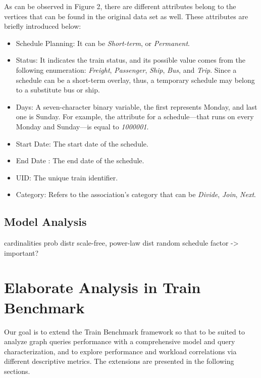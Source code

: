 As can be observed in Figure 2, %
there are different attributes belong to the vertices that can be found in the original data set as well. These attributes are briefly introduced below:
\begin{itemize}
	\item{\textsf{Schedule Planning}}: It can be \textit{Short-term}, or \textit{Permanent}.
	\item{\textsf{Status}}: It indicates the train status, and its possible value comes from the following enumeration: \textit{Freight}, \textit{Passenger}, \textit{Ship}, \textit{Bus}, and \textit{Trip}. Since a schedule can be a short-term overlay, thus, a temporary schedule may belong to a substitute bus or ship.
	\item{\textsf{Days}}: A seven-character binary variable, the first represents Monday, and last one is Sunday. For example, the attribute for a schedule---that runs on every Monday and Sunday---is equal to \textit{1000001}.
	\item{\textsf{Start Date}}: The start date of the schedule.
	\item{\textsf{End Date}} : The end date of the schedule.
	\item{\textsf{UID}}: The unique train identifier.
	\item{\textsf{Category}}: Refers to the association's category that can be \textit{Divide}, \textit{Join}, \textit{Next}.
\end{itemize}


\subsection{Model Analysis}\label{sec:model_analysis}
cardinalities
	prob distr
	scale-free, power-law dist
	random schedule factor -> important?





\section{Elaborate Analysis in Train Benchmark}

Our goal is to extend the Train Benchmark framework so that to be suited to analyze graph queries performance with a comprehensive model and query characterization, and to explore performance and workload correlations via different descriptive metrics. The extensions are presented in the following sections.

